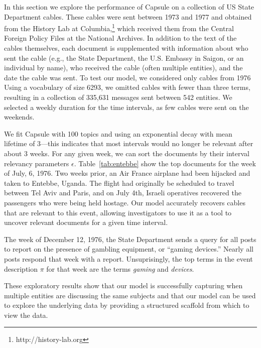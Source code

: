 
In this section we explore the performance of Capsule on a collection of US State Department cables.
These cables were sent between 1973 and 1977 and obtained from the History Lab at Columbia,\footnote{http://history-lab.org} which received them from the Central Foreign Policy Files at the National Archives. In addition to the text of the cables themselves, each document is supplemented with information about who sent the cable (e.g., the State Department, the U.S. Embassy in Saigon, or an individual by name), who received the cable (often multiple entities), and the date the cable was sent.  To test our model, we considered only cables from 1976 Using a vocabulary of size 6293, we omitted cables with fewer than three terms, resulting in a collection of 335,631 messages sent between 542 entities.  We selected a weekly duration for the time intervals, as few cables were sent on the weekends.

We fit Capsule with 100 topics and using an exponential decay with mean lifetime of 3---this indicates that most intervals would no longer be relevant after about 3 weeks.  For any given week, we can sort the documents by their interval relevancy parameters $\epsilon$. Table~\ref{tab:entebbe} show the top documents for the week of July, 6, 1976.  Two weeks prior, an Air France airplane had been hijacked and taken to Entebbe, Uganda.  The flight had originally be scheduled to travel between Tel Aviv and Paris, and on July 4th, Israeli operatives recovered the passengers who were being held hostage.  Our model accurately recovers cables that are relevant to this event, allowing investigators to use it as a tool to uncover relevant documents for a given time interval.

The week of December 12, 1976, the State Department sends a query for all posts to report on the presence of gambling equipment, or ``gaming devices.''  Nearly all posts respond that week with a report.  Unsuprisingly, the top terms in the event description $\pi$ for that week are the terms \emph{gaming} and \emph{devices}.

These exploratory results show that our model is successfully capturing when multiple entities are discussing the same subjects and that our model can be used to explore the underlying data by providing a structured scaffold from which to view the data.


